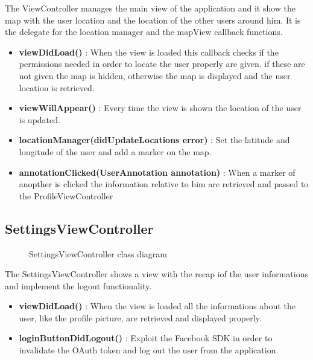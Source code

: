 The ViewController manages the main view of the application and it show the map with the user location and the location of the other users around him. It is the delegate for the location manager and the mapView callback functions.

\begin{itemize}
\item \textbf{viewDidLoad()} : When the view is loaded this callback checks if the permissions needed in order to locate the user properly are given. if these are not given the map is hidden, otherwise the map is displayed and the user location is retrieved.
\item \textbf{viewWillAppear()} : Every time the view is shown the location of the user is updated.
\item \textbf{locationManager(didUpdateLocations error)} : Set the latitude and longitude of the user and add a marker on the map.
\item \textbf{annotationClicked(UserAnnotation annotation)} : When a marker of anopther is clicked the information relative to him are retrieved and passed to the ProfileViewController
\end{itemize}

\subsection{SettingsViewController} 
\begin{figure}[H]
\caption{SettingsViewController class diagram}

\end{figure}

The SettingsViewController shows a view with the recap iof the user informations and implement the logout functionality.

\begin{itemize}
\item \textbf{viewDidLoad()} : When the view is loaded all the informations about the user, like the profile picture, are retrieved and displayed properly.
\item \textbf{loginButtonDidLogout()} : Exploit the Facebook SDK in order to invalidate the OAuth token and log out the user from the application.
\end{itemize}


